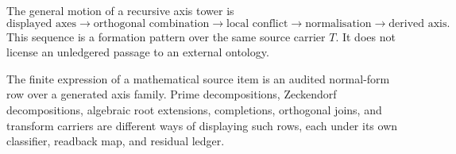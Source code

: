 \begin{principle}
\label{prin:recursive-axis-formation-sequence}
The general motion of a recursive axis tower is
$$
\text{displayed axes}
\to
\text{orthogonal combination}
\to
\text{local conflict}
\to
\text{normalisation}
\to
\text{derived axis}.
$$
This sequence is a formation pattern over the same source carrier $T$.
It does not license an unledgered passage to an external ontology.
\end{principle}

\begin{principle}
\label{prin:finite-expression-audited-normal-form}
The finite expression of a mathematical source item is an audited
normal-form row over a generated axis family. Prime decompositions,
Zeckendorf decompositions, algebraic root extensions, completions,
orthogonal joins, and transform carriers are different ways of
displaying such rows, each under its own classifier, readback map, and
residual ledger.
\end{principle}
